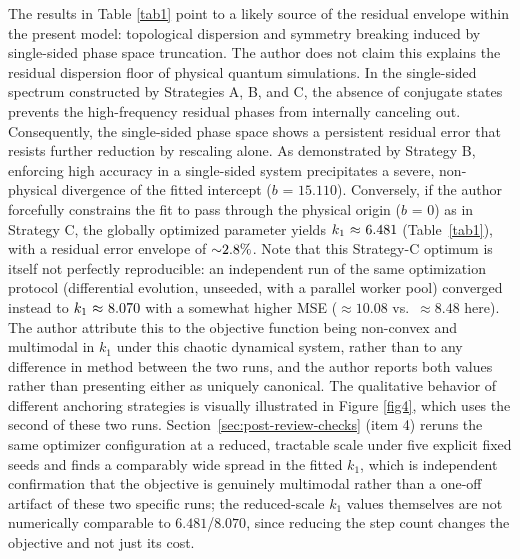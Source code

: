 \documentclass[mca,article,submit,oneauthor,pdftex]{Definitions/mdpi}
\begin{document}
The results in Table \ref{tab1} point to a likely source of the residual
envelope within the present model: topological dispersion and symmetry
breaking induced by single-sided phase space truncation. The author does not claim
this explains the residual dispersion floor of physical quantum simulations. In the
single-sided spectrum constructed by Strategies A, B, and C, the
absence of conjugate states prevents the high-frequency residual phases
from internally canceling out. Consequently, the single-sided phase
space shows a persistent residual error that resists further reduction by
rescaling alone. As demonstrated by
Strategy B, enforcing high accuracy in a single-sided system
precipitates a severe, non-physical divergence of the fitted intercept
(\({b}\text{ = 15.110}\)). Conversely, if the author forcefully constrains
the fit to pass through the physical origin (\({b}\text{ = 0}\)) as in Strategy C, the
globally optimized parameter yields
\({k}_{\text{1}}~\text{\ensuremath{\approx}~6.481}\) (Table~\ref{tab1}), with a
residual error envelope of
\(\text{\ensuremath{\sim}2.8\%}\). Note that this Strategy-C optimum is itself
not perfectly reproducible: an independent run of the same optimization
protocol (differential evolution, unseeded, with a parallel worker pool)
converged instead to \({k}_{\text{1}}~\text{\ensuremath{\approx}~8.070}\) with a
somewhat higher MSE ($\approx10.08$ vs.\ $\approx8.48$ here). The author attribute this
to the objective function being non-convex and multimodal in $k_1$ under this
chaotic dynamical system, rather than to any difference in method between the
two runs, and the author reports both values rather than presenting either as
uniquely canonical. The qualitative behavior of different anchoring
strategies is visually illustrated in {Figure \ref{fig4}}, which uses the
second of these two runs. Section~\ref{sec:post-review-checks} (item 4)
reruns the same optimizer configuration at a reduced, tractable scale
under five explicit fixed seeds and finds a comparably wide spread in the
fitted $k_1$, which is independent confirmation that the objective is
genuinely multimodal rather than a one-off artifact of these two specific
runs; the reduced-scale $k_1$ values themselves are not numerically
comparable to $6.481$/$8.070$, since reducing the step count changes the
objective and not just its cost.
\end{document}
